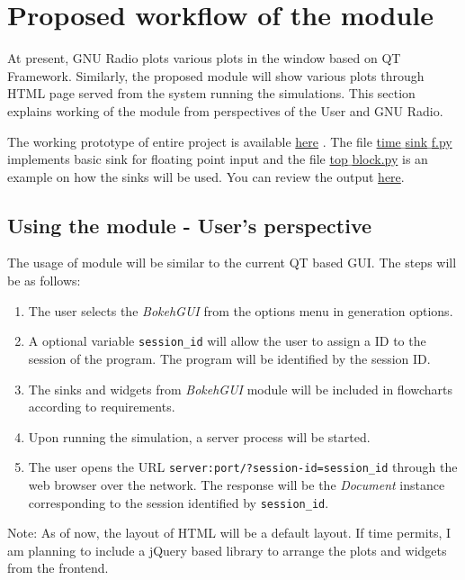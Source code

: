 \documentclass[a4paper, 11pt]{article}
\begin{document}
\section{Proposed workflow of the module}

At present, GNU Radio plots various plots in the window based on QT Framework. Similarly, the proposed module will show various plots through HTML page served from the system running the simulations. This section explains working of the module from perspectives of the User and GNU Radio.

The working prototype of entire project is available \href{https://github.com/kartikp1995/gr-htmlgui/}{here} \cite{htmlGui}. The file \href{https://github.com/kartikp1995/gr-htmlgui/blob/master/python/time_sink_f.py}{time$\_$sink$\_$f.py} implements basic sink for floating point input and the file \href{https://github.com/kartikp1995/gr-htmlgui/blob/master/examples/top_block.py}{top$\_$block.py} is an example on how the sinks will be used. You can review the output \href{http://terminal.kartikpatel.in:5006/?bokeh-session-id=h4NyPINXVEniemWudNItOhpEwM1U9NvoC3WaHu1Dmfyr}{here}.

\subsection{Using the module - User's perspective}
The usage of module will be similar to the current QT based GUI. The steps will be as follows:
\begin{enumerate}
\item The user selects the \textit{BokehGUI} from the options menu in generation options.
\item A optional variable \texttt{session\_id} will allow the user to assign a ID to the session of the program. The program will be identified by the session ID.
\item The sinks and widgets from \textit{BokehGUI} module will be included in flowcharts according to requirements.
\item Upon running the simulation, a server process will be started.
\item The user opens the URL \texttt{server:port/?session-id=session\_id} through the web browser over the network. The response will be the \textit{Document} instance corresponding to the session identified by \texttt{session\_id}.
\end{enumerate}
Note: As of now, the layout of HTML will be a default layout. If time permits, I am planning to include a jQuery based library \cite{arrange} to arrange the plots and widgets from the frontend.
\end{document}
